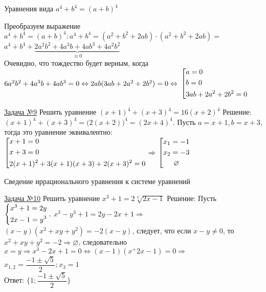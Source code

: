 \documentclass[a4paper,12pt]{article} %
\begin{document}
\begin{center}
{\large Уравнения вида $a^4+b^4=(a+b)^4$}
\end{center}
 
Преобразуем выражение $a^4+b^4=(a+b)^4: a^4+b^4=(a^2+b^2+2ab)\cdot(a^2+b^2+2ab)=$
$a^4+b^4+\underbrace{2a^2b^2+4a^3b+4ab^3+4a^2b^2}_{\equiv 0}$\\
Очевидно, что тождество будет верным, когда $6a^2b^2+4a^3b+4ab^3=0 \Leftrightarrow\\ 2ab(3ab+2a^2+2b^2)=0 \Leftrightarrow$
$\left[\begin{gathered}
	a=0 \hfill \\
	b=0 \hfill \\
	3ab+2a^2+2b^2=0
\end{gathered}\right.$

\label{Problem9}
\underline{Задача №9} 
Решить уравнение $(x+1)^4+(x+3)^4=16(x+2)^4$\newline
Решение: $(x+1)^4+(x+3)^4=\big( 2(x+2) \big)^4=(2x+4)^4$. Пусть $a=x+1,b=x+3$, тогда
это уравнение эквивалентно:
$\left[\begin{gathered}
	x+1=0 \hfill \\
	x+3=0 \hfill \\
	2(x+1)^2+3(x+1)(x+3)+2(x+3)^2=0
\end{gathered}\right. \Rightarrow$
$\left[\begin{gathered}
	x_1=-1 \hfill \\
	x_2=-3 \hfill \\
	\varnothing
\end{gathered}\right.$\\

\begin{center}
{\large Сведение иррационального уравнения к системе уравнений}
\end{center}
 
\label{Problem10}
\underline{Задача №10} 
Решить уравнение $x^3+1=2\sqrt[3]{2x-1}$\newline
Решение: Пусть 
$\begin{dcases}
	x^3+1=2y \\
	2x-1=y^3
\end{dcases} ,$
$x^3-y^3+1=2y-2x+1 \Rightarrow$
$(x-y)(x^2+xy+y^2)=-2(x-y)$, следует, что если $x-y\ne0$, то $x^2+xy+y^2=-2 \Rightarrow \varnothing$, 
следовательно $x=y \Rightarrow x^3-2x+1=0 \Leftrightarrow (x-1)(x^+2x-1)=0 \Rightarrow$
$x_{1,2}=\dfrac{-1\pm\sqrt5}{2}; x_3=1$\\
Ответ: $\{ 1; \dfrac{-1\pm\sqrt5}{2} \}$
\end{document}
